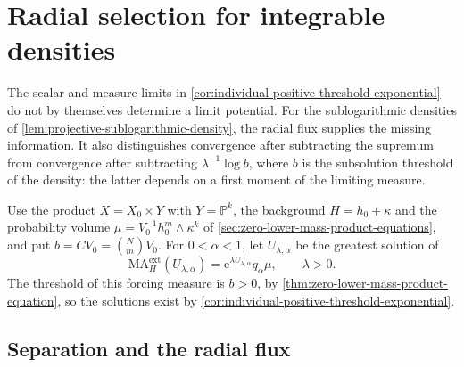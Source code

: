 \section{Radial selection for integrable densities}
\label{sec:radial-integrable-selection}

The scalar and measure limits in \cref{cor:individual-positive-threshold-exponential} do not by themselves determine a limit potential. For the sublogarithmic densities of \cref{lem:projective-sublogarithmic-density}, the radial flux supplies the missing information. It also distinguishes convergence after subtracting the supremum from convergence after subtracting $\lambda^{-1}\log b$, where $b$ is the subsolution threshold of the density: the latter depends on a first moment of the limiting measure.

Use the product $X=X_0\times Y$ with $Y=\mathbb P^k$, the background $H=h_0+\kappa$ and the probability volume $\mu=V_0^{-1}h_0^m\wedge\kappa^k$ of \cref{sec:zero-lower-mass-product-equations}, and put $b=CV_0=\binom NmV_0$. For $0<\alpha<1$, let $U_{\lambda,\alpha}$ be the greatest solution of
\[
 \mathrm{MA}^{\mathrm{ext}}_H(U_{\lambda,\alpha})
       =\mathrm e^{\lambda U_{\lambda,\alpha}}q_\alpha\mu,
 \qquad \lambda>0.
\]
The threshold of this forcing measure is $b>0$, by \cref{thm:zero-lower-mass-product-equation}, so the solutions exist by \cref{cor:individual-positive-threshold-exponential}.

\subsection{Separation and the radial flux}

